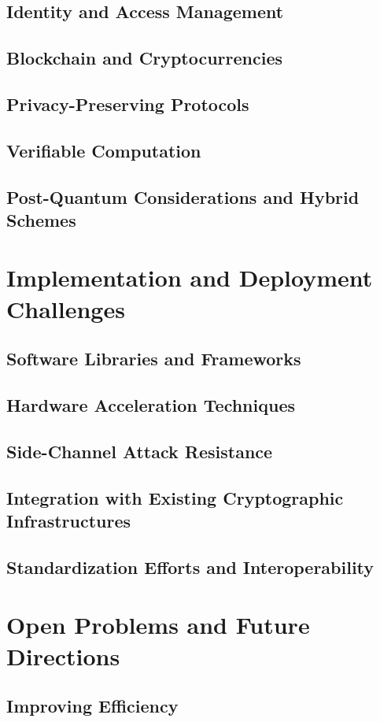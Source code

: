 \documentclass{iacrtrans}
\begin{document}
\subsection{Identity and Access Management}
\subsection{Blockchain and Cryptocurrencies}
\subsection{Privacy-Preserving Protocols}
\subsection{Verifiable Computation}
\subsection{Post-Quantum Considerations and Hybrid Schemes}

\section{Implementation and Deployment Challenges}
\subsection{Software Libraries and Frameworks}
\subsection{Hardware Acceleration Techniques}
\subsection{Side-Channel Attack Resistance}
\subsection{Integration with Existing Cryptographic Infrastructures}
\subsection{Standardization Efforts and Interoperability}

\section{Open Problems and Future Directions}
\subsection{Improving Efficiency}
\end{document}
